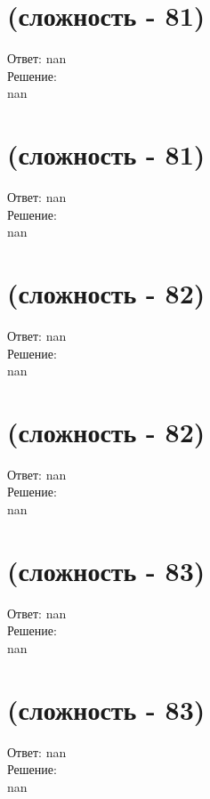 \documentclass[a4paper,11pt]{article}%
\begin{document}
%
\section{(сложность {-} 81)}%
\label{sec:( {-} 81)}%
\hspace{3ex} Ответ: nan \\%
%
\hspace*{3ex} Решение: \\%
nan

%
\section{(сложность {-} 81)}%
\label{sec:( {-} 81)}%
\hspace{3ex} Ответ: nan \\%
%
\hspace*{3ex} Решение: \\%
nan

%
\section{(сложность {-} 82)}%
\label{sec:( {-} 82)}%
\hspace{3ex} Ответ: nan \\%
%
\hspace*{3ex} Решение: \\%
nan

%
\section{(сложность {-} 82)}%
\label{sec:( {-} 82)}%
\hspace{3ex} Ответ: nan \\%
%
\hspace*{3ex} Решение: \\%
nan

%
\section{(сложность {-} 83)}%
\label{sec:( {-} 83)}%
\hspace{3ex} Ответ: nan \\%
%
\hspace*{3ex} Решение: \\%
nan

%
\section{(сложность {-} 83)}%
\label{sec:( {-} 83)}%
\hspace{3ex} Ответ: nan \\%
%
\hspace*{3ex} Решение: \\%
nan

%
\end{document}
